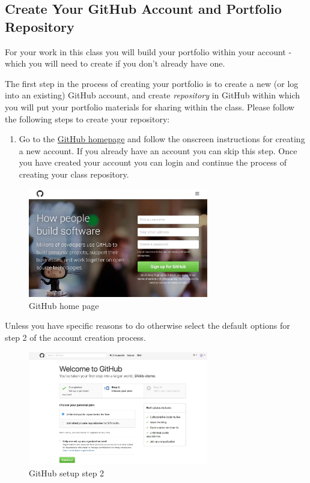 \documentclass[]{book}
\providecommand{\tightlist}{%
  \setlength{\itemsep}{0pt}\setlength{\parskip}{0pt}}
\begin{document}
\subsection{Create Your GitHub Account and Portfolio
Repository}\label{create-your-github-account-and-portfolio-repository}

For your work in this class you will build your portfolio within your
account - which you will need to create if you don't already have one.

The first step in the process of creating your portfolio is to create a
new (or log into an existing) GitHub account, and create
\emph{repository} in GitHub within which you will put your portfolio
materials for sharing within the class. Please follow the following
steps to create your repository:

\begin{enumerate}
\def\labelenumi{\arabic{enumi}.}
\tightlist
\item
  Go to the \href{https://github.com/}{GitHub homepage} and follow the
  onscreen instructions for creating a new account. If you already have
  an account you can skip this step. Once you have created your account
  you can login and continue the process of creating your class
  repository.
\end{enumerate}

\begin{figure}[htbp]
\centering
\includegraphics[width=0.70000\textwidth]{images/github_home.jpg}
\caption{GitHub home page}
\end{figure}

Unless you have specific reasons to do otherwise select the default
options for step 2 of the account creation process.

\begin{figure}[htbp]
\centering
\includegraphics[width=0.70000\textwidth]{images/github_step2.jpg}
\caption{GitHub setup step 2}
\end{figure}
\end{document}
